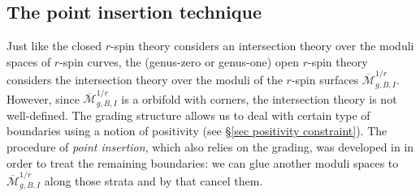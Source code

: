 \documentclass[11pt]{amsart}
\theoremstyle{definition}
\theoremstyle{remark}
\newcommand{\<}{\left<}
\renewcommand{\>}{\right>}
\numberwithin{equation}{section}
\def\Mbar{{\overline{\mathcal M}}}
\begin{document}
\subsection{The point insertion technique}\label{subsec PI}
Just like the closed $r$-spin theory considers an intersection theory over the moduli spaces of $r$-spin curves,  the (genus-zero or genus-one) open $r$-spin theory considers the intersection theory over the moduli of the $r$-spin surfaces $\Mbar^{1/r}_{g,B,I}$. However, since $\Mbar^{1/r}_{g,B,I}$ is a orbifold with corners, the intersection theory is not well-defined. The grading structure allows us to deal with certain type of boundaries using a notion of positivity (see \S \ref{sec positivity constraint}). The procedure of \textit{point insertion}, which also relies on the grading, was developed in \cite{TZ1} in order to treat the remaining boundaries: we can glue another moduli spaces  to $\Mbar^{1/r}_{g,B,I}$ along those strata and by that cancel them. 
\end{document}
